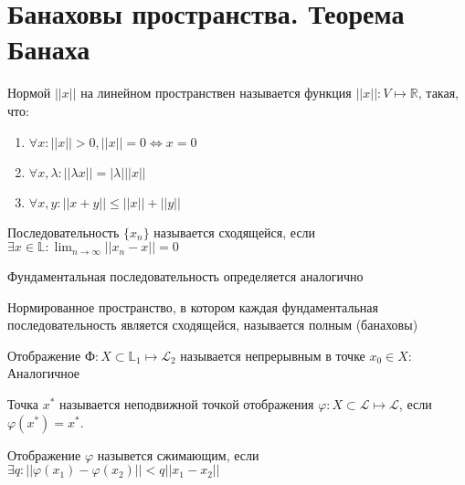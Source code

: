 \documentclass[document.tex]{subfiles}
\begin{document}
\section{Банаховы пространства. Теорема Банаха}

\begin{definition}
Нормой $||x||$ на линейном пространствен называется функция $||x|| : V \mapsto \mathbb{R}$, такая, что:
	\begin{enumerate}
		\item $\forall x : ||x|| > 0, ||x|| = 0 \Leftrightarrow x = 0$
		\item $\forall x, \lambda : ||\lambda x|| = |\lambda| ||x||$
		\item $\forall x, y : ||x + y|| \leq ||x|| + ||y||$
	\end{enumerate}
\end{definition}

\begin{definition}
	Последовательность $\{x_n\}$ называется сходящейся, если $\exists x \in \mathbb{L}: \lim_{n \rightarrow \infty} ||x_n - x|| = 0$
\end{definition}

\begin{definition}
	Фундаментальная последовательность определяется аналогично
\end{definition}

\begin{definition}
	Нормированное пространство, в котором каждая фундаментальная последовательность является сходящейся, называется полным (банаховы)
\end{definition}

\begin{definition}
	Отображение $Ф : X \subset \mathbb{L}_1 \mapsto \mathcal{L}_2$ называется непрерывным в точке $x_0 \in X$:
	Аналогичное
	
\end{definition}

\begin{definition}
	Точка $x^*$ называется неподвижной точкой отображения $\varphi : X \subset \mathcal{L} \mapsto \mathcal{L}$, если $\varphi(x^*) = x^*$.
\end{definition}

\begin{definition}
	Отображение $\varphi$ назывется сжимающим, если $\exists q : ||\varphi(x_1) - \varphi(x_2)|| < q ||x_1 - x_2||$
\end{definition}
\end{document}
